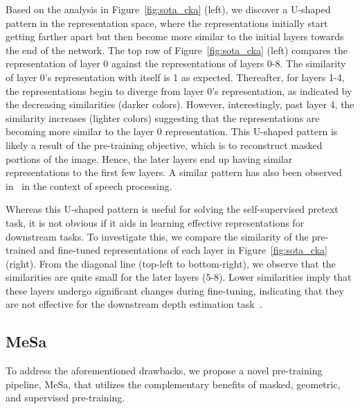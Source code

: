 Based on the analysis in Figure~\ref{fig:sota_cka} (left), we discover a U-shaped pattern in the representation space, where the representations initially start getting farther apart but then become more similar to the initial layers towards the end of the network. The top row of Figure~\ref{fig:sota_cka} (left) compares the representation of layer 0 against the representations of layers 0-8. The similarity of layer 0’s representation with itself is 1 as expected. Thereafter, for layers 1-4, the representations begin to diverge from layer 0's representation, as indicated by the decreasing similarities (darker colors). However, interestingly, past layer 4, the similarity increases (lighter colors) suggesting that the representations are becoming more similar to the layer 0 representation. This U-shaped pattern is likely a result of the pre-training objective, which is to reconstruct masked portions of the image. Hence, the later layers end up having similar representations to the first few layers. A similar pattern has also been observed in~\citep{pasad2021layer,pasad2023comparative} in the context of speech processing.

Whereas this U-shaped pattern is useful for solving the self-supervised pretext task, it is not obvious if it aids in learning effective representations for downstream tasks. To investigate this, we compare the similarity of the pre-trained and fine-tuned representations of each layer in Figure~\ref{fig:sota_cka} (right). From the diagonal line (top-left to bottom-right), we observe that the similarities are quite small for the later layers (5-8). Lower similarities imply that these layers undergo significant changes during fine-tuning, indicating that they are not effective for the downstream depth estimation task~\citep{neyshabur2020being}.
\subsection{MeSa}
\label{sec:magis}
To address the aforementioned drawbacks, we propose a novel pre-training pipeline, MeSa, that utilizes the complementary benefits of masked, geometric, and supervised pre-training.

